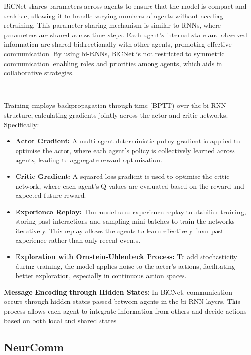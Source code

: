 \documentclass{article}
\begin{document}
BiCNet shares parameters across agents to ensure that the model is compact and scalable, allowing it to handle varying numbers of agents without needing retraining. This parameter-sharing mechanism is similar to RNNs, where parameters are shared across time steps. Each agent’s internal state and observed information are shared bidirectionally with other agents, promoting effective communication. By using bi-RNNs, BiCNet is not restricted to symmetric communication, enabling roles and priorities among agents, which aids in collaborative strategies.

\

Training employs backpropagation through time (BPTT) over the bi-RNN structure, calculating gradients jointly across the actor and critic networks. Specifically:

\begin{itemize}
    \item \textbf{Actor Gradient:} A multi-agent deterministic policy gradient is applied to optimise the actor, where each agent’s policy is collectively learned across agents, leading to aggregate reward optimisation.
    
    \item \textbf{Critic Gradient:} A squared loss gradient is used to optimise the critic network, where each agent’s Q-values are evaluated based on the reward and expected future reward.
    
    \item \textbf{Experience Replay:} The model uses experience replay to stabilise training, storing past interactions and sampling mini-batches to train the networks iteratively. This replay allows the agents to learn effectively from past experience rather than only recent events.
    
    \item \textbf{Exploration with Ornstein-Uhlenbeck Process:} To add stochasticity during training, the model applies noise to the actor's actions, facilitating better exploration, especially in continuous action spaces.
\end{itemize}

\textbf{Message Encoding through Hidden States:} In BiCNet, communication occurs through hidden states passed between agents in the bi-RNN layers. This process allows each agent to integrate information from others and decide actions based on both local and shared states.

\subsection{NeurComm}
\end{document}
